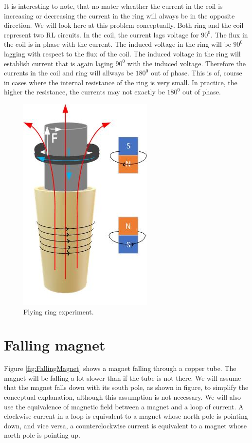 \documentclass{ximera}
\begin{document}
It is interesting to note, that no mater wheather the current in the coil is increasing or decreasing the current in the ring will always be in the opposite direction. We will look here at this problem conceptually. Both ring and the coil represent two RL circuits. In the coil, the current lags voltage for $90^0$. The flux in the coil is in phase with the current. The induced voltage in the ring will be $90^0$ lagging with respect to the flux of the coil. The induced voltage in the ring will establish current that is again laging $90^0$ with the induced voltage. Therefore the currents in the coil and ring will allways be  $180^0$ out of phase. This is of, course in cases where the internal resistance of the ring is very small. In practice, the higher the resistance, the currents may not exactly be $180^0$ out of phase.



\begin{figure}[htbp]
\begin{center}
\includegraphics[scale=0.8]{../jpg/flyingRing1.jpg}
\end{center}
\caption{Flying ring experiment.}
\label{fig:FlyingRing}
\end{figure}




\section{Falling magnet}


Figure \ref{fig:FallingMagnet} shows a magnet falling through a copper tube. The magnet will be falling a lot slower than if the tube is not there. We will assume that the magnet falls down with its south pole, as shown in figure, to simplify the conceptual explanation, although this assumption is not necessary. We will also use the equivalence of magnetic field between a magnet and a loop of current. A clockwise current in a loop is equivalent to a magnet whose  north pole is pointing down, and vice versa, a counterclockwise current is equivalent to a magnet whose north pole is pointing up.
\end{document}
